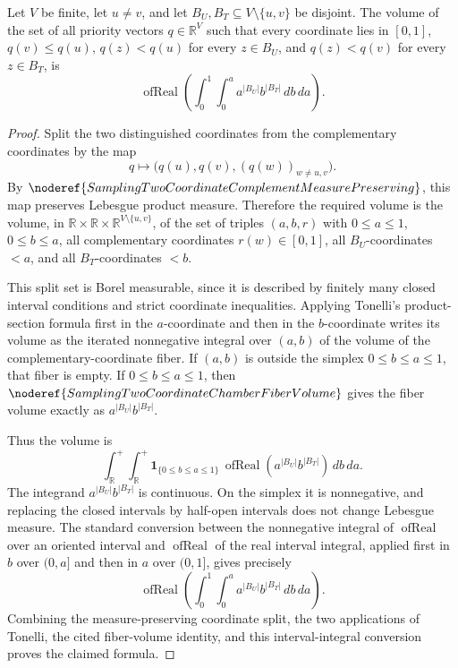 \begin{helper}
Let \(V\) be finite, let \(u\ne v\), and let \(B_U,B_T\subseteq
V\setminus\{u,v\}\) be disjoint.  The volume of the set of all priority
vectors \(q\in\mathbb R^V\) such that every coordinate lies in \([0,1]\),
\(q(v)\le q(u)\), \(q(z)<q(u)\) for every \(z\in B_U\), and
\(q(z)<q(v)\) for every \(z\in B_T\), is
\[
\operatorname{ofReal}\left(\int_0^1\int_0^a
a^{|B_U|}b^{|B_T|}\,db\,da\right).
\]
\end{helper}
\begin{proof}
Split the two distinguished coordinates from the complementary coordinates
by the map
\[
q\mapsto\bigl(q(u),q(v),(q(w))_{w\ne u,v}\bigr).
\]
By \(\noderef{SamplingTwoCoordinateComplementMeasurePreserving}\), this map
preserves Lebesgue product measure.  Therefore the required volume is the
volume, in
\(\mathbb R\times\mathbb R\times\mathbb R^{V\setminus\{u,v\}}\), of the set
of triples \((a,b,r)\) with \(0\le a\le1\), \(0\le b\le a\), all
complementary coordinates \(r(w)\in[0,1]\), all \(B_U\)-coordinates
\(<a\), and all \(B_T\)-coordinates \(<b\).

This split set is Borel measurable, since it is described by finitely many
closed interval conditions and strict coordinate inequalities.  Applying
Tonelli's product-section formula first in the \(a\)-coordinate and then in
the \(b\)-coordinate writes its volume as the iterated nonnegative integral
over \((a,b)\) of the volume of the complementary-coordinate fiber.  If
\((a,b)\) is outside the simplex \(0\le b\le a\le1\), that fiber is empty.
If \(0\le b\le a\le1\), then
\(\noderef{SamplingTwoCoordinateChamberFiberVolume}\) gives the fiber volume
exactly as \(a^{|B_U|}b^{|B_T|}\).

Thus the volume is
\[
\int_{\mathbb R}^{+}\int_{\mathbb R}^{+}
\mathbf 1_{\{0\le b\le a\le1\}}\,
\operatorname{ofReal}(a^{|B_U|}b^{|B_T|})\,db\,da .
\]
The integrand \(a^{|B_U|}b^{|B_T|}\) is continuous.  On the simplex it is
nonnegative, and replacing the closed intervals by half-open intervals does
not change Lebesgue measure.  The standard conversion between the
nonnegative integral of \(\operatorname{ofReal}\) over an oriented interval
and \(\operatorname{ofReal}\) of the real interval integral, applied first in
\(b\) over \((0,a]\) and then in \(a\) over \((0,1]\), gives precisely
\[
\operatorname{ofReal}\left(\int_0^1\int_0^a
a^{|B_U|}b^{|B_T|}\,db\,da\right).
\]
Combining the measure-preserving coordinate split, the two applications of
Tonelli, the cited fiber-volume identity, and this interval-integral
conversion proves the claimed formula.
\end{proof}
